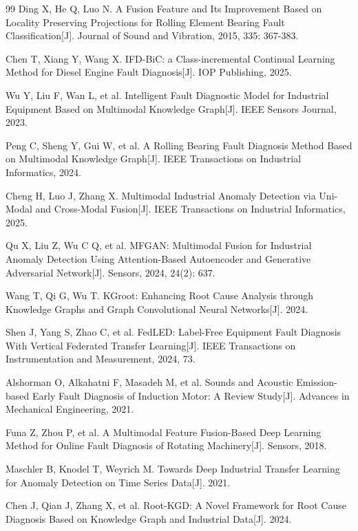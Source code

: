 \documentclass{heuthesis}
\begin{document}
\begin{thebibliography}{99}
Ding X, He Q, Luo N. A Fusion Feature and Its Improvement Based on Locality Preserving Projections for Rolling Element Bearing Fault Classification[J]. Journal of Sound and Vibration, 2015, 335: 367-383.

Chen T, Xiang Y, Wang X. IFD-BiC: a Class-incremental Continual Learning Method for Diesel Engine Fault Diagnosis[J]. IOP Publishing, 2025.

Wu Y, Liu F, Wan L, et al. Intelligent Fault Diagnostic Model for Industrial Equipment Based on Multimodal Knowledge Graph[J]. IEEE Sensors Journal, 2023.

Peng C, Sheng Y, Gui W, et al. A Rolling Bearing Fault Diagnosis Method Based on Multimodal Knowledge Graph[J]. IEEE Transactions on Industrial Informatics, 2024.

Cheng H, Luo J, Zhang X. Multimodal Industrial Anomaly Detection via Uni-Modal and Cross-Modal Fusion[J]. IEEE Transactions on Industrial Informatics, 2025.

Qu X, Liu Z, Wu C Q, et al. MFGAN: Multimodal Fusion for Industrial Anomaly Detection Using Attention-Based Autoencoder and Generative Adversarial Network[J]. Sensors, 2024, 24(2): 637.

Wang T, Qi G, Wu T. KGroot: Enhancing Root Cause Analysis through Knowledge Graphs and Graph Convolutional Neural Networks[J]. 2024.

Shen J, Yang S, Zhao C, et al. FedLED: Label-Free Equipment Fault Diagnosis With Vertical Federated Transfer Learning[J]. IEEE Transactions on Instrumentation and Measurement, 2024, 73.

Alshorman O, Alkahatni F, Masadeh M, et al. Sounds and Acoustic Emission-based Early Fault Diagnosis of Induction Motor: A Review Study[J]. Advances in Mechanical Engineering, 2021.

Funa Z, Zhou P, et al. A Multimodal Feature Fusion-Based Deep Learning Method for Online Fault Diagnosis of Rotating Machinery[J]. Sensors, 2018.

Maschler B, Knodel T, Weyrich M. Towards Deep Industrial Transfer Learning for Anomaly Detection on Time Series Data[J]. 2021.

Chen J, Qian J, Zhang X, et al. Root-KGD: A Novel Framework for Root Cause Diagnosis Based on Knowledge Graph and Industrial Data[J]. 2024.


\end{thebibliography}
\end{document}
